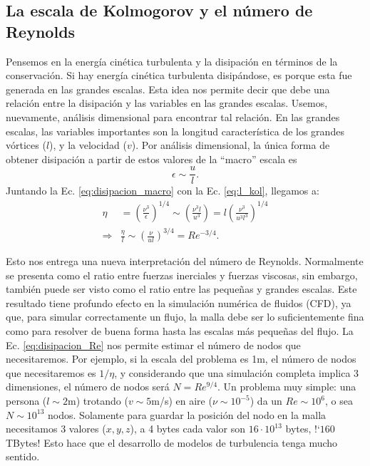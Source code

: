 \subsection*{La escala de Kolmogorov y el número de Reynolds}

Pensemos en la energía cinética turbulenta y la disipación en términos de la conservación.
Si hay energía cinética turbulenta disipándose, es porque esta fue generada en las grandes escalas.
Esta idea nos permite decir que debe una relación entre la disipación y las variables en las grandes escalas.
Usemos, nuevamente, análisis dimensional para encontrar tal relación.
En las grandes escalas, las variables importantes son la longitud característica de los grandes vórtices ($l$), y la velocidad ($v$).
Por análisis dimensional, la única forma de obtener disipación a partir de estos valores de la ``macro'' escala es
%
\begin{equation}\label{eq:disipacion_macro}
\epsilon\sim\frac{u}{l}.
\end{equation}
%
Juntando la Ec. \eqref{eq:disipacion_macro} con la Ec. \eqref{eq:l_kol}, llegamos a:
%
\begin{align}\label{eq:disipacion_Re}
\eta &= \left(\frac{\nu^3}{\epsilon}\right)^{1/4} \sim \left(\frac{\nu^3 l}{u^3}\right) = l\left(\frac{\nu^3}{u^3l^3}\right)^{1/4} \nonumber\\
\Rightarrow & \frac{\eta}{l} \sim \left(\frac{\nu}{ul}\right)^{3/4} = Re^{-3/4}.
\end{align}

Esto nos entrega una nueva interpretación del número de Reynolds.
Normalmente se presenta como el ratio entre fuerzas inerciales y fuerzas viscosas, sin embargo, también puede ser visto como el ratio entre las pequeñas y grandes escalas.
Este resultado tiene profundo efecto en la simulación numérica de fluidos (CFD), ya que, para simular correctamente un flujo, la malla debe ser lo suficientemente fina como para resolver de buena forma hasta las escalas más pequeñas del flujo.
La Ec. \eqref{eq:disipacion_Re} nos permite estimar el número de nodos que necesitaremos. 
Por ejemplo, si la escala del problema es 1m, el número de nodos que necesitaremos es $1/\eta$, y considerando que una simulación completa implica 3 dimensiones, el número de nodos será $N=Re^{9/4}$.
Un problema muy simple: una persona ($l\sim 2$m) trotando ($v\sim 5$m/s) en aire ($\nu\sim10^{-5}$) da un $Re\sim10^6$, o sea $N\sim10^{13}$ nodos.
Solamente para guardar la posición del nodo en la malla necesitamos 3 valores ($x, y, z$), a 4 bytes cada valor son $16\cdot10^{13}$ bytes, \mbox{!`}$160$ TBytes!
Esto hace que el desarrollo de modelos de turbulencia tenga mucho sentido.

